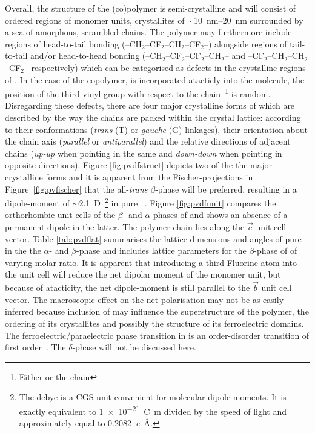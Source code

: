 Overall, the structure of the (co)polymer is semi-crystalline and will consist of ordered regions of monomer units, crystallites of $\sim$\SIrange{10}{20}{\nano\metre} surrounded by a sea of amorphous, scrambled chains. The polymer may furthermore include regions of head-to-tail bonding (--CH$_2$--CF$_2$--CH$_2$--CF$_2$--) alongside regions of tail-to-tail and/or head-to-head bonding (--CH$_2$--CF$_2$--CF$_2$--CH$_2$-- and --CF$_2$--CH$_2$--CH$_2$--CF$_2$-- respectively) which can be categorised as defects in the crystalline regions of \pvdf{}. In the case of the copolymer, \trfe{} is incorporated atacticly into the molecule, \ie{} the position of the third vinyl-group with respect to the chain~\footnote{Either  or  the chain} is random. Disregarding these defects, there are four major crystalline forms of \pvdf{} which are described by the way the chains are packed within the crystal lattice: according to their conformations (\emph{trans} (T) or \emph{gauche} (G) linkages), their orientation about the chain axis (\emph{parallel} or \emph{antiparallel}) and the relative directions of adjacent chains (\emph{up-up} when pointing in the same and \emph{down-down} when pointing in opposite directions). Figure \ref{fig:pvdfstruct} depicts two of the the major crystalline forms and it is apparent from the Fischer-projections in Figure~\ref{fig:pvfischer} that the all-\emph{trans} $\beta$-phase will be preferred, resulting in a dipole-moment of $\sim$\SI{2.1}{D}~\footnote{The debye is a CGS-unit convenient for molecular dipole-moments. It is exactly equivalent to \SI{1e-21}{\coulomb\metre} divided by the speed of light and  approximately equal to \SI{0.2082}{\elementarycharge\angstrom}.} in pure \pvdf{}~\cite[p. 810]{encyclopedia}. Figure \ref{fig:pvdfunit} compares the orthorhombic unit cells of the $\beta$- and $\alpha$-phases of \pvdf{} and shows an absence of a permanent dipole in the latter. The polymer chain lies along the $\vec{c}$ unit cell vector. Table \ref{tab:pvdflat} summarises the lattice dimensions and angles of pure \pvdf{} in the the $\alpha$- and $\beta$-phase and includes lattice parameters for the $\beta$-phase of \pvfe{} of varying molar ratio. It is apparent that introducing a third Fluorine atom into the unit cell will reduce the net dipolar moment of the monomer unit, but because of atacticity, the net dipole-moment is still parallel to the $\vec{b}$ unit cell vector. The macroscopic effect on the net polarisation may not be as easily inferred because inclusion of \trfe{} may influence the superstructure of the polymer, the ordering of its crystallites and possibly the structure of its ferroelectric domains. The ferroelectric/paraelectric phase transition in \pvdf{} is an order-disorder transition of first order~\cite{takeo}. The $\delta$-phase will not be discussed here.
